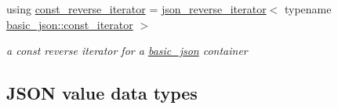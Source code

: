 \begin{DoxyCompactItemize}
using \mbox{\hyperlink{classnlohmann_1_1basic__json_a72be3c24bfa24f0993d6c11af03e7404}{const\+\_\+reverse\+\_\+iterator}} = \mbox{\hyperlink{classnlohmann_1_1detail_1_1json__reverse__iterator}{json\+\_\+reverse\+\_\+iterator}}$<$ typename \mbox{\hyperlink{classnlohmann_1_1basic__json_a41a70cf9993951836d129bb1c2b3126a}{basic\+\_\+json\+::const\+\_\+iterator}} $>$
\begin{DoxyCompactList}\small\item\em a const reverse iterator for a \mbox{\hyperlink{classnlohmann_1_1basic__json}{basic\+\_\+json}} container \end{DoxyCompactList}\end{DoxyCompactItemize}
\subsection*{J\+S\+ON value data types}
\label{_amgrpbddfba6d49869d59bfd397e65b8cba87}%
